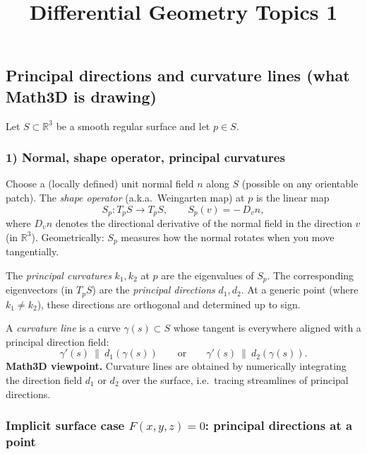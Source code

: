 \documentclass[12pt,a4paper]{article}
\title{Differential Geometry Topics 1}
\author{}
\date{}
\theoremstyle{plain}
\theoremstyle{definition}      %
\begin{document}
	\maketitle



\subsection*{Principal directions and curvature lines (what Math3D is drawing)}

Let $S\subset\mathbb{R}^3$ be a smooth regular surface and let $p\in S$.

\subsubsection*{1) Normal, shape operator, principal curvatures}

Choose a (locally defined) unit normal field $n$ along $S$ (possible on any orientable patch).
The \emph{shape operator} (a.k.a.\ Weingarten map) at $p$ is the linear map
\[
S_p:T_pS\to T_pS, 
\qquad 
S_p(v)= -\,D_v n,
\]
where $D_v n$ denotes the directional derivative of the normal field in the direction $v$ (in $\mathbb{R}^3$).
Geometrically: $S_p$ measures how the normal rotates when you move tangentially.

The \emph{principal curvatures} $k_1,k_2$ at $p$ are the eigenvalues of $S_p$.
The corresponding eigenvectors (in $T_pS$) are the \emph{principal directions} $d_1,d_2$.
At a generic point (where $k_1\neq k_2$), these directions are orthogonal and determined up to sign.

A \emph{curvature line} is a curve $\gamma(s)\subset S$ whose tangent is everywhere aligned with
a principal direction field:
\[
\gamma'(s)\ \parallel\ d_1(\gamma(s))
\qquad\text{or}\qquad
\gamma'(s)\ \parallel\ d_2(\gamma(s)).
\]
\noindent
\textbf{Math3D viewpoint.} Curvature lines are obtained by numerically integrating the direction field
$d_1$ or $d_2$ over the surface, i.e.\ tracing streamlines of principal directions.

\subsubsection*{Implicit surface case $F(x,y,z)=0$: principal directions at a point}
\end{document}

